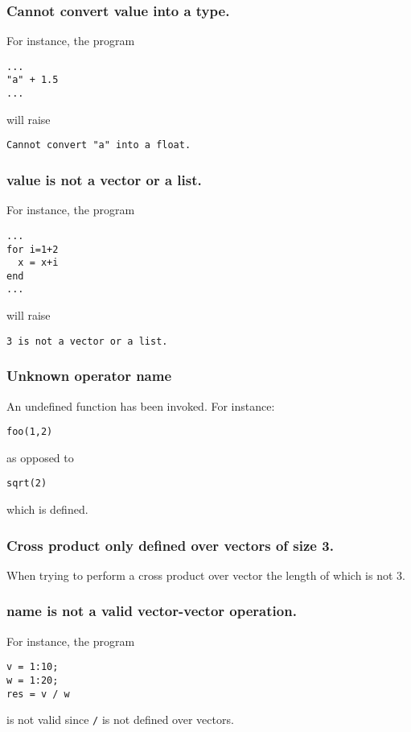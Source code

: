 \subsubsection{Cannot convert value into a type.}

For instance, the program
%
\begin{lstlisting}
...
"a" + 1.5
...
\end{lstlisting}
%
will raise
%
\begin{lstlisting}
Cannot convert "a" into a float.
\end{lstlisting}

\subsubsection{value is not a vector or a list.}

For instance, the program
%
\begin{lstlisting}
...
for i=1+2 
  x = x+i
end
...
\end{lstlisting}
%
will raise
%
\begin{lstlisting}
3 is not a vector or a list.
\end{lstlisting}

\subsubsection{Unknown operator name}

An undefined function has been invoked. For instance:
%
\begin{lstlisting}
foo(1,2)
\end{lstlisting}
%
as opposed to
%
\begin{lstlisting}
sqrt(2)
\end{lstlisting}
%
which is defined.
\subsubsection{Cross product only defined over vectors of size 3.}

When trying to perform a cross product over vector the length of which is not 3.
\subsubsection{name is not a valid vector-vector operation.}

For instance, the program
%
\begin{lstlisting}
v = 1:10;
w = 1:20;
res = v / w
\end{lstlisting}
%
is not valid since \lstinline{/} is not defined over vectors.
